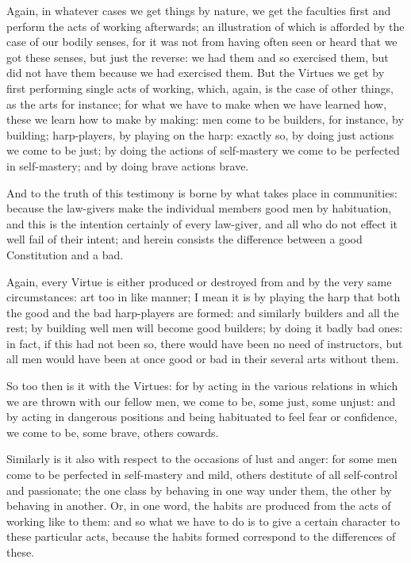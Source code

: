 Again, in whatever cases we get things by nature, we get the faculties
first and perform the acts of working afterwards; an illustration of
which is afforded by the case of our bodily senses, for it was not
from having often seen or heard that we got these senses, but just
the reverse: we had them and so exercised them, but did not have
them because we had exercised them. But the Virtues we get by first
performing single acts of working, which, again, is the case of other
things, as the arts for instance; for what we have to make when we
have learned how, these we learn how to make by making: men come to be
builders, for instance, by building; harp-players, by playing on the
harp: exactly so, by doing just actions we come to be just; by doing the
actions of self-mastery we come to be perfected in self-mastery; and by
doing brave actions brave.

And to the truth of this testimony is borne by what takes place in
communities: because the law-givers make the individual members good men
by habituation, and this is the intention certainly of every law-giver,
and all who do not effect it well fail of their intent; and herein
consists the difference between a good Constitution and a bad.

Again, every Virtue is either produced or destroyed from and by the very
same circumstances: art too in like manner; I mean it is by playing
the harp that both the good and the bad harp-players are formed: and
similarly builders and all the rest; by building well men will become
good builders; by doing it badly bad ones: in fact, if this had not been
so, there would have been no need of instructors, but all men would have
been at once good or bad in their several arts without them.

So too then is it with the Virtues: for by acting in the various
relations in which we are thrown with our fellow men, we come to be,
some just, some unjust: and by acting in dangerous positions and being
habituated to feel fear or confidence, we come to be, some brave, others
cowards.

Similarly is it also with respect to the occasions of lust and anger:
for some men come to be perfected in self-mastery and mild, others
destitute of all self-control and passionate; the one class by behaving
in one way under them, the other by behaving in another. Or, in one
word, the habits are produced from the acts of working like to them: and
so what we have to do is to give a certain character to these particular
acts, because the habits formed correspond to the differences of these.

